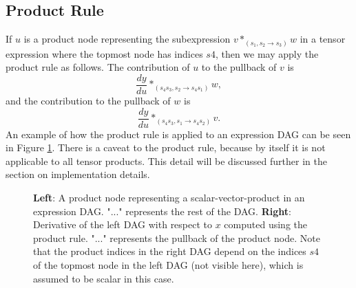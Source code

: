 \documentclass[12pt, a4paper]{report}
\begin{document}
\subsection{Product Rule}
If $u$ is a product node representing the subexpression $v *_{(s_1,s_2 \rightarrow s_3)} w$ in a tensor expression where the topmost node has indices $s4$, then we may apply the product rule as follows.
The contribution of $u$ to the pullback of $v$ is 
$$
\frac{dy}{du} *_{(s_4s_3,s_2 \rightarrow s_4s_1)} w,
$$
and the contribution to the pullback of $w$ is 
$$
\frac{dy}{du} *_{(s_4s_3,s_1 \rightarrow s_4s_2)} v.
$$
An example of how the product rule is applied to an expression DAG can be seen in Figure \ref{fig:prod_rule}.
There is a caveat to the product rule, because by itself it is not applicable to all tensor products.
This detail will be discussed further in the section on implementation details.

\begin{figure}
    \centering
    \begin{minipage}{7cm}
        \centering
    \end{minipage}
    \begin{minipage}{7cm}
        \centering
    \end{minipage}
    \caption{\textbf{Left}: A product node representing a scalar-vector-product in an expression DAG. "..." represents the rest of the DAG. \textbf{Right}: Derivative of the left DAG with respect to $x$ computed using the product rule. "..." represents the pullback of the product node. Note that the product indices in the right DAG depend on the indices $s4$ of the topmost node in the left DAG (not visible here), which is assumed to be scalar in this case.}
    \label{fig:prod_rule}
\end{figure}
\end{document}
